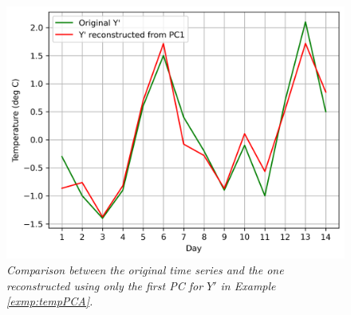 \begin{figure}[h!]
\centering
\includegraphics[scale = 0.8]{graphics/PCA_exmp_3.png}
\caption{\textit{Comparison between the original time series and the one reconstructed using only the first PC for $Y'$ in Example \ref{exmp:tempPCA}.}}
\end{figure}

